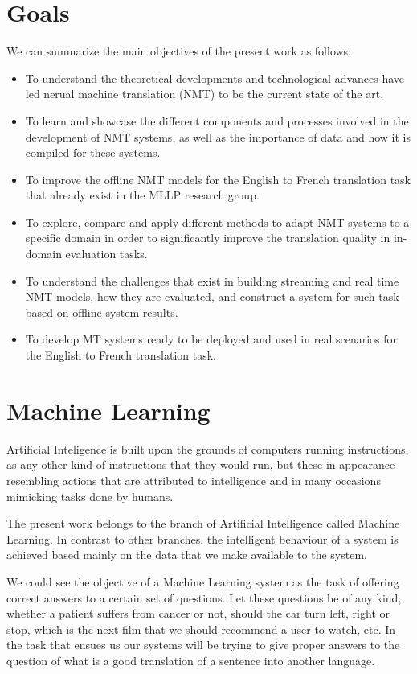 \documentclass[11pt,english,listoffigures,listoftables]{tfgetsinf}
\begin{document}
\section{Goals}

We can summarize the main objectives of the present work as follows:
\begin{itemize}
    \item To understand the theoretical developments and technological advances have led nerual machine translation (NMT) to be the current state of the art.
    \item To learn and showcase the different components and processes involved in the development of NMT systems, as well as the importance of data and how it is compiled for these systems.
    \item To improve the offline NMT models for the English to French translation task that already exist in the MLLP research group.
    \item To explore, compare and apply different methods to adapt NMT systems to a specific domain in order to significantly improve the translation quality in in-domain evaluation tasks.
    \item To understand the challenges that exist in building streaming and real time NMT models, how they are evaluated, and construct a system for such task based on offline system results.
    \item To develop MT systems ready to be deployed and used in real scenarios for the English to French translation task.
\end{itemize}

\section{Machine Learning}\label{ml}

Artificial Inteligence is built upon the grounds of computers running instructions, as any other kind of instructions that they would run, but these in appearance resembling actions that are attributed to intelligence and in many occasions mimicking tasks done by humans.
 
The present work belongs to the branch of Artificial Intelligence called Machine Learning. In contrast to other branches, the intelligent behaviour of a system is achieved based mainly on the data that we make available to the system.

We could see the objective of a Machine Learning system as the task of offering correct answers to a certain set of questions. Let these questions be of any kind, whether a patient suffers from cancer or not, should the car turn left, right or stop, which is the next film that we should recommend a user to watch, etc. In the task that ensues us our systems will be trying to give proper answers to the question of what is a good translation of a sentence into another language.
\end{document}
